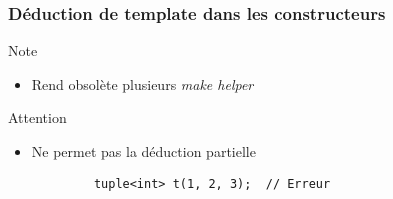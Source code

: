 \documentclass[C++.tex]{subfiles}
\begin{document}
\begin{frame}[fragile]
\frametitle{Déduction de template dans les constructeurs}
	\begin{block}{Note}
		\begin{itemize}
			\item Rend obsolète plusieurs \textit{make helper}
		\end{itemize}
	\end{block}

	\begin{alertblock}{Attention}
		\begin{itemize}
			\item Ne permet pas la déduction partielle
		\end{itemize}

		\begin{verbatim}
			tuple<int> t(1, 2, 3);  // Erreur
		\end{verbatim}
	\end{alertblock}
\end{frame}
\end{document}
